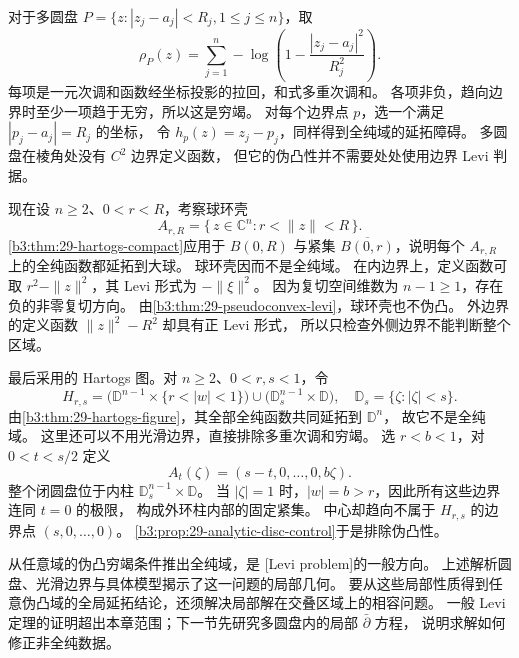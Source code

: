 \ProseParagraphBreak
对于多圆盘 \(P=\{z:|z_j-a_j|<R_j, 1\le j\le n\}\)，取
\[
 \rho_P(z)=\sum_{j=1}^n
      -\log\left(1-\frac{|z_j-a_j|^2}{R_j^2}\right).
\]
每项是一元次调和函数经坐标投影的拉回，和式多重次调和。
各项非负，趋向边界时至少一项趋于无穷，所以这是穷竭。
对每个边界点 \(p\)，选一个满足 \(|p_j-a_j|=R_j\) 的坐标，
令 \(h_p(z)=z_j-p_j\)，同样得到全纯域的延拓障碍。
多圆盘在棱角处没有 \(C^2\) 边界定义函数，
但它的伪凸性并不需要处处使用边界 Levi 判据。

\ProseParagraphBreak
现在设 \(n\ge2\)、\(0<r<R\)，考察球环壳
\[
 A_{r,R}=\{\,z\in\mathbb C^n:r<\|z\|<R\,\}.
\]
\cref{b3:thm:29-hartogs-compact}应用于 \(B(0,R)\) 与紧集
\(\overline{B(0,r)}\)，说明每个 \(A_{r,R}\) 上的全纯函数都延拓到大球。
球环壳因而不是全纯域。
在内边界上，定义函数可取 \(r^2-\|z\|^2\)，其 Levi 形式为
\(-\|\xi\|^2\)。
因为复切空间维数为 \(n-1\ge1\)，存在负的非零复切方向。
由\cref{b3:thm:29-pseudoconvex-levi}，球环壳也不伪凸。
外边界的定义函数 \(\|z\|^2-R^2\) 却具有正 Levi 形式，
所以只检查外侧边界不能判断整个区域。

\ProseParagraphBreak
最后采用的 Hartogs 图。对 \(n\ge2\)、\(0<r,s<1\)，令
\[
 H_{r,s}
 =\bigl(\mathbb D^{n-1}\times\{r<|w|<1\}\bigr)
  \cup\bigl(\mathbb D_s^{n-1}\times\mathbb D\bigr),
 \quad \mathbb D_s=\{\zeta:|\zeta|<s\}.
\]
由\cref{b3:thm:29-hartogs-figure}，其全部全纯函数共同延拓到 \(\mathbb D^n\)，
故它不是全纯域。
这里还可以不用光滑边界，直接排除多重次调和穷竭。
选 \(r<b<1\)，对 \(0<t<s/2\) 定义
\[
 A_t(\zeta)=(s-t,0,\ldots,0,b\zeta).
\]
整个闭圆盘位于内柱 \(\mathbb D_s^{n-1}\times\mathbb D\)。
当 \(|\zeta|=1\) 时，\(|w|=b>r\)，因此所有这些边界连同 \(t=0\) 的极限，
构成外环柱内部的固定紧集。
中心却趋向不属于 \(H_{r,s}\) 的边界点 \((s,0,\ldots,0)\)。
\cref{b3:prop:29-analytic-disc-control}于是排除伪凸性。

\ProseParagraphBreak
从任意域的伪凸穷竭条件推出全纯域，是
[Levi problem]的一般方向。
上述解析圆盘、光滑边界与具体模型揭示了这一问题的局部几何。
要从这些局部性质得到任意伪凸域的全局延拓结论，还须解决局部解在交叠区域上的相容问题。
一般 Levi 定理的证明超出本章范围；下一节先研究多圆盘内的局部 \(\bar\partial\) 方程，
说明求解如何修正非全纯数据。
